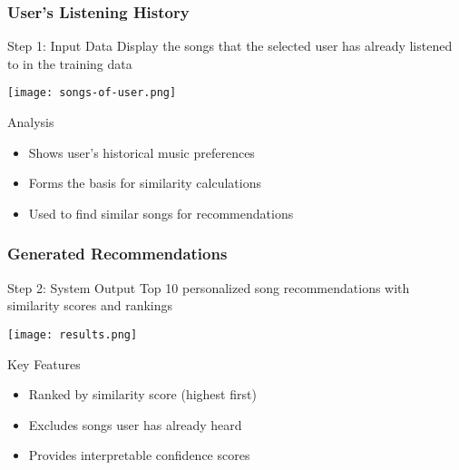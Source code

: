 \documentclass[11pt]{beamer}
\begin{document}
\begin{frame}
\frametitle{User's Listening History}
\begin{block}{Step 1: Input Data}
Display the songs that the selected user has already listened to in the training data
\end{block}

\begin{center}
\texttt{[image: songs-of-user.png]}
\end{center}

\begin{block}{Analysis}
\begin{itemize}
\item Shows user's historical music preferences
\item Forms the basis for similarity calculations
\item Used to find similar songs for recommendations
\end{itemize}
\end{block}
\end{frame}

\begin{frame}
\frametitle{Generated Recommendations}
\begin{block}{Step 2: System Output}
Top 10 personalized song recommendations with similarity scores and rankings
\end{block}

\begin{center}
\texttt{[image: results.png]}
\end{center}

\begin{block}{Key Features}
\begin{itemize}
\item Ranked by similarity score (highest first)
\item Excludes songs user has already heard
\item Provides interpretable confidence scores
\end{itemize}
\end{block}
\end{frame}
\end{document}
